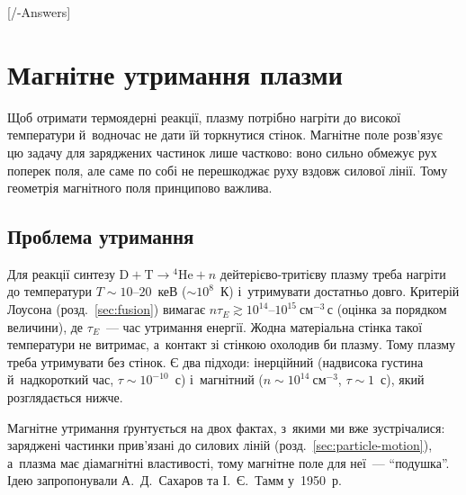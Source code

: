 

\graphicspath{{\currfilebase/Pictures}}

[\currfilebase/\currfilebase-Answers]
\chapter{Магнітне утримання плазми}\label{sec:magnetic-confinement}\hypertarget{magnetic-confinement}{}

Щоб отримати термоядерні реакції, плазму потрібно нагріти до високої температури
й~водночас не дати їй торкнутися стінок. Магнітне поле розв'язує цю задачу для заряджених
частинок лише частково: воно сильно обмежує рух поперек поля, але саме по собі не
перешкоджає руху вздовж силової лінії. Тому геометрія магнітного поля принципово важлива.

\section{Проблема утримання}

Для реакції синтезу $\mathrm D+\mathrm T\to{}^4\mathrm{He}+n$ дейтерієво-тритієву плазму
треба нагріти до температури $T\sim10$--$20$~кеВ ($\sim10^8$~К) і~утримувати
достатньо довго. Критерій Лоусона (розд.~\ref{sec:fusion}) вимагає
$n\tau_E\gtrsim10^{14}$--$10^{15}~\mathrm{см}^{-3}\,\mathrm{с}$ (оцінка за порядком
величини), де $\tau_E$~--- час утримання енергії. Жодна матеріальна стінка такої
температури не витримає, а~контакт зі стінкою охолодив би плазму. Тому плазму треба
утримувати без стінок. Є два підходи: інерційний (надвисока густина й~надкороткий час,
$\tau\sim10^{-10}$~с) і~магнітний ($n\sim10^{14}~\mathrm{см}^{-3}$, $\tau\sim1$~с), який
розглядається нижче.

Магнітне утримання ґрунтується на двох фактах, з~якими ми вже зустрічалися: заряджені
частинки прив'язані до силових ліній (розд.~\ref{sec:particle-motion}), а~плазма має
діамагнітні властивості, тому магнітне поле для неї~--- \enquote{подушка}. Ідею
запропонували А.~Д.~Сахаров та І.~Є.~Тамм у~1950~р.

